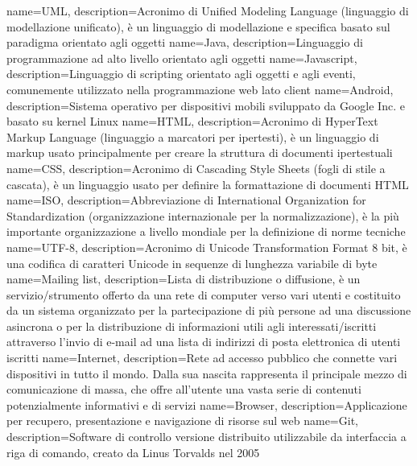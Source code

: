  {
	name=UML,
	description={Acronimo di Unified Modeling Language (linguaggio di modellazione
	unificato), è un linguaggio di modellazione e specifica basato sul paradigma
	orientato agli oggetti}
}
 {
	name=Java,
	description={Linguaggio di programmazione ad alto livello orientato agli oggetti}
}
 {
	name=Javascript,
	description={Linguaggio di scripting orientato agli oggetti e agli eventi, 
	comunemente utilizzato nella programmazione web lato client}
}
 {
	name=Android,
	description={Sistema operativo per dispositivi mobili sviluppato da Google Inc. e basato su
	kernel Linux}
}
 {
	name=HTML,
	description={Acronimo di HyperText Markup Language (linguaggio a marcatori per
	ipertesti), è un linguaggio di markup usato principalmente per creare la
	struttura di documenti ipertestuali}
}
 {
	name=CSS,
	description={Acronimo di Cascading Style Sheets (fogli di stile a cascata), è un linguaggio
	usato per definire la formattazione di documenti HTML}
}
 {
	name=ISO,
	description={Abbreviazione di International Organization for Standardization (organizzazione
	internazionale per la normalizzazione), è la più importante organizzazione a livello mondiale
	per la definizione di norme tecniche}
}
 {
	name=UTF-8,
	description={Acronimo di Unicode Transformation Format 8 bit, è una codifica di caratteri
	Unicode in sequenze di lunghezza variabile di byte}
}
 {
	name=Mailing list,
	description={Lista di distribuzione o diffusione, è un servizio/strumento offerto da una rete
	di computer verso vari utenti e costituito da un sistema organizzato per la partecipazione di
	più persone ad una discussione asincrona o per la distribuzione di informazioni utili agli
	interessati/iscritti attraverso l'invio di e-mail ad una lista di indirizzi di posta
	elettronica di utenti iscritti}
}
 {
	name=Internet,
	description={Rete ad accesso pubblico che connette vari dispositivi in tutto il mondo.
	Dalla sua nascita rappresenta il principale mezzo di comunicazione di massa, che offre
	all'utente una vasta serie di contenuti potenzialmente informativi e di servizi}
}
 {
	name=Browser,
	description={Applicazione per recupero, presentazione e navigazione di risorse sul web}
}
 {
	name=Git,
	description={Software di controllo versione distribuito utilizzabile da interfaccia
	a riga di comando, creato da Linus Torvalds nel 2005}
}
